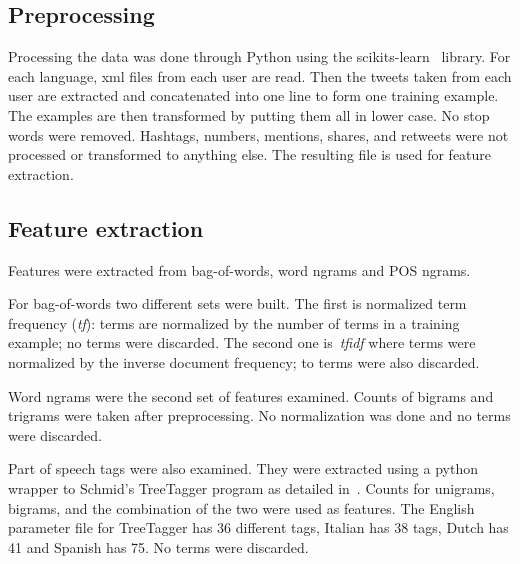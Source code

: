 \documentclass[a4paper]{llncs}
\begin{document}
\subsection{Preprocessing}
Processing the data was done through Python using the scikits-learn~\cite{scikit-learn} library. For each language, xml files from each user are read. Then the tweets taken from each user are extracted and concatenated into one line to form one training example. The examples are then transformed by putting them all in lower case. No stop words were removed. Hashtags, numbers, mentions, shares, and retweets were not processed or transformed to anything else. The resulting file is used for feature extraction.  

\subsection{Feature extraction}
Features were extracted from bag-of-words, word ngrams and POS ngrams. 

For bag-of-words two different sets were built. The first is normalized term frequency ({\it tf}): terms are normalized by the number of terms in a training example; no terms were discarded. The second one is~\textit{tfidf} where terms were normalized by the inverse document frequency; to terms were also discarded. 

Word ngrams were the second set of features examined. Counts of bigrams and trigrams were taken after preprocessing. No normalization was done and no terms were discarded. 

Part of speech tags were also examined. They were extracted using a python wrapper to Schmid's TreeTagger program as detailed in~\cite{schmid1994probabilistic}. Counts for unigrams, bigrams, and the combination of the two were used as features. The English parameter file for TreeTagger has 36 different tags, Italian has 38 tags, Dutch has 41 and Spanish has 75. No terms were discarded.
\end{document}
